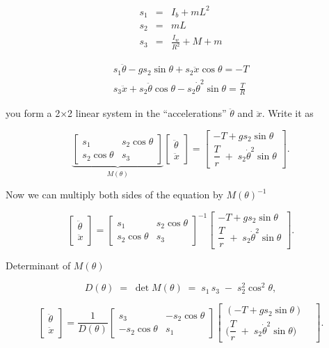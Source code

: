 \documentclass[]{article}
\begin{document}
\begin{eqnarray*}
s_1 & = & I_b + m L^2  \\
s_2 & = & m L \\
s_3 & = & \frac{I_w}{R^2} + M + m
\end{eqnarray*}

\begin{eqnarray*}
s_1 \ddot{\theta} - g s_2 \sin \theta + s_2 \ddot{x} \cos \theta = - T  \\
s_3 \ddot{x} + s_2 \ddot{\theta} \cos \theta - s_2 \dot{\theta}^2 \sin \theta = \frac{T}{R}
\end{eqnarray*}

you form a 2×2 linear system in the “accelerations” $\ddot\theta$ and $\ddot x$.  Write it as

$$
\underbrace{\begin{bmatrix}
s_1 & s_2  \cos \theta  \\
s_2 \cos \theta & s_3
\end{bmatrix}}_{M(\theta)}
\begin{bmatrix}\ddot\theta\\[3pt]\ddot x\end{bmatrix}
=
\begin{bmatrix}
-T + g s_2 \sin \theta \\[6pt]
\dfrac{T}{r} \; + \;s_2 \dot{\theta}^2 \sin \theta 
\end{bmatrix}.
$$

Now we can multiply both sides of the equation by $M(\theta)^{-1}$

$$
\begin{bmatrix}\ddot\theta\\[3pt]\ddot x\end{bmatrix}
=
\begin{bmatrix}
s_1 & s_2  \cos \theta  \\
s_2 \cos \theta & s_3
\end{bmatrix}
^{-1}
\begin{bmatrix}
-T + g s_2 \sin \theta \\[6pt]
\dfrac{T}{r} \; + \;s_2 \dot{\theta}^2 \sin \theta 
\end{bmatrix}.
$$


Determinant of $M(\theta)$

$$
D(\theta) \;=\;\det M(\theta)\;=\;s_1\,s_3 \;-\;s_2^2\cos^2\theta,
$$

$$
\begin{bmatrix}\ddot\theta\\[3pt]\ddot x\end{bmatrix}
= \frac{1}{D(\theta)}
\begin{bmatrix}
s_3 & -s_2  \cos \theta  \\
-s_2 \cos \theta & s_1
\end{bmatrix}
\begin{bmatrix}
(-T + g s_2 \sin \theta) &  \\[6pt]
\Big(\dfrac{T}{r} \; + \;s_2 \dot{\theta}^2 \sin \theta \Big)
\end{bmatrix}.
$$
\end{document}
